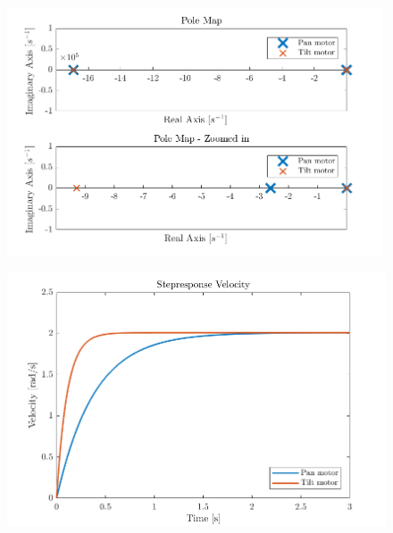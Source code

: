 \documentclass[../../main.tex]{subfiles}
\begin{document}
\begin{figure}
\centering
\begin{minipage}{.5\textwidth}
  \centering
  \includegraphics[width = 0.99\textwidth]{Sections/System_Modelling/Images/polesPlant.png}
      \label{fig:polesPlant}
\end{minipage}%
\begin{minipage}{.5\textwidth}
  \centering
  \includegraphics[width = 0.99 \textwidth]{Sections/System_Modelling/Images/stepResponseVelPlant.png}
  \label{fig:StepVelPlant}
\end{minipage}
\end{figure}
\end{document}
